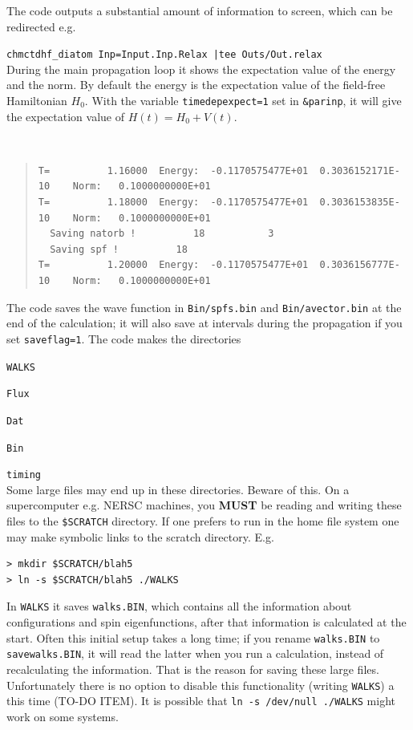 \documentclass[10pt,leqno, oneside]{book}
\begin{document}
The code outputs a substantial amount of information to screen, which can be redirected e.g. 

   \verb#chmctdhf_diatom Inp=Input.Inp.Relax |tee Outs/Out.relax#  \\

  During the main propagation loop 
it shows the expectation value of the energy and the norm.  By default the energy is 
the expectation value of the field-free Hamiltonian $H_0$.  With the variable 
\verb#timedepexpect=1# set in \verb#&parinp#, it will give the expectation value of $H(t)=H_0 + V(t)$.

\

{\footnotesize\begin{quote}
\begin{verbatim}
T=          1.16000  Energy:  -0.1170575477E+01  0.3036152171E-10    Norm:   0.1000000000E+01
T=          1.18000  Energy:  -0.1170575477E+01  0.3036153835E-10    Norm:   0.1000000000E+01
  Saving natorb !          18           3
  Saving spf !          18
T=          1.20000  Energy:  -0.1170575477E+01  0.3036156777E-10    Norm:   0.1000000000E+01
\end{verbatim}
\end{quote}}

The code saves the wave function in \verb#Bin/spfs.bin# and \verb#Bin/avector.bin# at the end 
of the calculation; it will also save at intervals during the propagation if you set \verb#saveflag=1#.  
The code makes the directories 

\verb#WALKS#

\verb#Flux#

\verb#Dat#

\verb#Bin#

\verb#timing# \\
Some large files may end up in these directories.  Beware of this.  
On a supercomputer e.g. NERSC machines, you \textbf{MUST} be reading and writing these files to the \verb#$SCRATCH# directory.  If one prefers to run
in the home file system one may make symbolic links to the scratch directory.  E.g.
\begin{verbatim}
> mkdir $SCRATCH/blah5
> ln -s $SCRATCH/blah5 ./WALKS
\end{verbatim}

In \verb#WALKS# it saves \verb#walks.BIN#, which contains all the information about configurations and spin eigenfunctions, after that information
is calculated at the start.  Often this initial setup takes a long time; if you rename \verb#walks.BIN# to \verb#savewalks.BIN#, it
will read the latter when you run a calculation, instead of recalculating the information.  That is the reason for saving these large files.  Unfortunately
there is no option to disable this functionality (writing \verb#WALKS#) a this time (TO-DO ITEM).  It is possible that \verb#ln -s /dev/null ./WALKS# 
might work on some systems.
\end{document}
